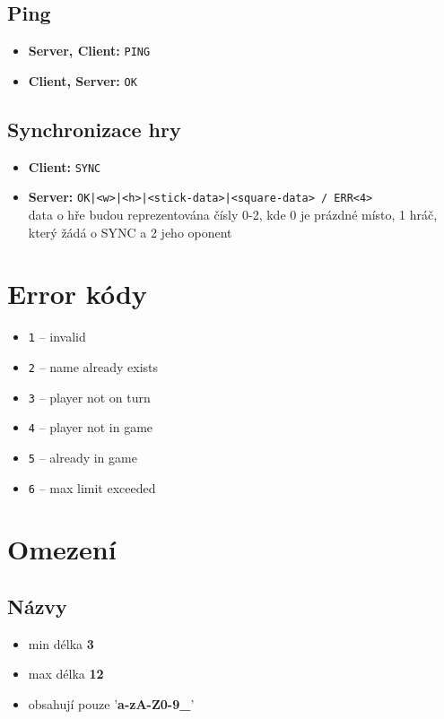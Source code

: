 \documentclass[11pt,a4paper]{article}
\begin{document}
\subsection*{Ping}
\begin{itemize}
	\item \textbf{Server, Client:} \texttt{PING}
	\item \textbf{Client, Server:} \texttt{OK}
\end{itemize}

\subsection*{Synchronizace hry}
\begin{itemize}
	\item \textbf{Client:} \texttt{SYNC}
	\item \textbf{Server:} \texttt{OK|<w>|<h>|<stick-data>|<square-data> / ERR<4>}
	\\ data o hře budou reprezentována čísly 0-2, kde 0 je prázdné místo, 1 hráč, který žádá o SYNC a 2 jeho oponent
\end{itemize}

\section{Error kódy}
\begin{itemize}
	\item \texttt{1} -- invalid
	\item \texttt{2} -- name already exists
	\item \texttt{3} -- player not on turn
	\item \texttt{4} -- player not in game
	\item \texttt{5} -- already in game
	\item \texttt{6} -- max limit exceeded
\end{itemize}

\section{Omezení}
\subsection{Názvy}
\begin{itemize}
	\item min délka \textbf{3}
	\item max délka \textbf{12}
	\item obsahují pouze '\textbf{a-zA-Z0-9\_}'
\end{itemize}
\end{document}
